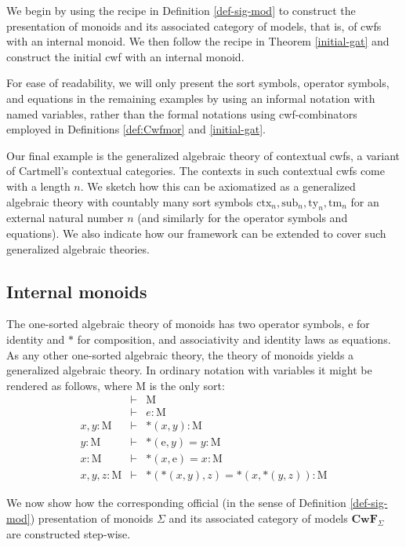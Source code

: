 \documentclass{lmcs}
\newcommand{\FYI}[1]{{\color{red}#1}}
\def\Cwf{\mathbf{CwF}}
\def\Mon{\mathrm{M}}
\def\idmon{\mathrm{e}}
\def\comp{\mathrm{*}}
\newcommand{\ctx}{\mathrm{ctx}}
\newcommand{\sub}{\mathrm{sub}}
\newcommand{\ty}{\mathrm{ty}}
\newcommand{\tm}{\mathrm{tm}}
\begin{document}
We begin by using the recipe in Definition \ref{def-sig-mod} to construct the \FYI{presentation of} monoids and its associated category of models, that is, of cwfs with an internal monoid. We then follow the recipe in Theorem \ref{initial-gat} and construct the initial cwf with an internal monoid.

For ease of readability, we will only present the sort symbols, operator symbols, and equations in the remaining examples by using an informal notation with named variables, rather than the formal notations using cwf-combinators employed in Definitions \ref{def:Cwfmor} and \ref{initial-gat}.

Our final example is the generalized algebraic theory of contextual cwfs, a variant of Cartmell's contextual categories. The contexts in such contextual cwfs come with a length $n$. We sketch how this can be axiomatized as a generalized algebraic theory with countably many sort symbols $\ctx_n, \sub_n, \ty_n, \tm_n$ for an external natural number $n$ (and similarly for the operator symbols and equations). We also indicate how our framework can be extended to cover such generalized algebraic theories.

\subsection{Internal monoids}\label{monoids}
 The one-sorted algebraic theory of monoids has two operator symbols,
$\idmon$ for identity and $\comp$ for composition, and associativity and identity laws as equations.
As any other one-sorted algebraic theory, the theory of monoids yields a
generalized algebraic theory. In ordinary notation with variables it might be rendered as follows, where $\Mon$ is the only sort:
\begin{eqnarray*}
&\vdash& \Mon\\
&\vdash& e : \Mon\\
x, y : \Mon &\vdash& \comp(x,y) : \Mon\\
y : \Mon &\vdash& \comp(\idmon,y) = y : \Mon\\
x : \Mon &\vdash& \comp(x,\idmon) = x : \Mon\\
x, y, z : \Mon &\vdash& \comp(\comp(x,y),z) = \comp(x,\comp(y,z)) : \Mon
\end{eqnarray*}

We now show how the corresponding official (in the sense of Definition \ref{def-sig-mod}) \FYI{presentation of} monoids $\Sigma$ and its associated category of models $\Cwf_\Sigma$ are constructed step-wise.
\end{document}
